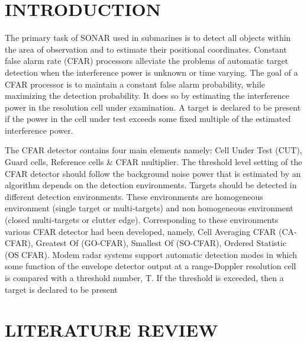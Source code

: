 \documentclass[10pt]{report}
\begin{document}
 \newpage

\clearpage
\setcounter{page}{1}



\chapter {INTRODUCTION}
\label{intro}

\setlength{\parindent}{10ex}
The primary task of SONAR used in submarines is to detect all objects within the area 
of observation and to estimate their positional coordinates. Constant false alarm rate (CFAR) processors alleviate the problems of 
automatic target detection when the interference power is unknown or time varying. The goal 
of a CFAR processor is to maintain a constant false alarm probability, while maximizing the 
detection probability. It does so by estimating the interference power in the resolution cell 
under examination. A target is declared to be present if the power in the cell under test exceeds 
some fixed multiple of the estimated interference power.










The CFAR detector contains four main elements namely: Cell Under Test (CUT), 
Guard cells, Reference cells & CFAR multiplier. The threshold level setting of the CFAR 
detector should follow the background noise power that is estimated by an algorithm depends 
on the detection environments. Targets should be detected in different detection environments. 
These environments are homogeneous environment (single target or multi-targets) and nonhomogeneous environment (closed multi-targets or clutter edge). Corresponding to these 
environments various CFAR detector had been developed, namely, Cell Averaging CFAR 
(CA-CFAR), Greatest Of (GO-CFAR), Smallest Of (SO-CFAR), Ordered Statistic (OSCFAR). Modem radar systems support automatic detection modes in which some function of 
the envelope detector output at a range-Doppler resolution cell is compared with a threshold 
number, T. If the threshold is exceeded, then a target is declared to be present

\chapter {LITERATURE REVIEW}
\end{document}

